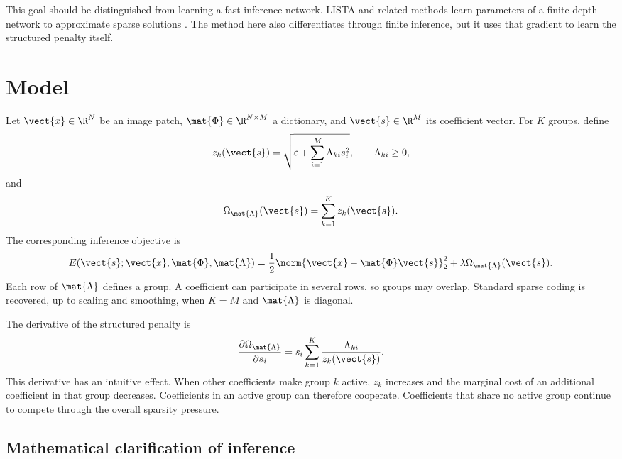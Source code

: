 This goal should be distinguished from learning a fast inference network. LISTA and related methods learn parameters of a finite-depth network to approximate sparse solutions \citep{gregor10}. The method here also differentiates through finite inference, but it uses that gradient to learn the structured penalty itself.

\section{Model}
\label{sec:group-model}

Let $\vect{x}\in\R^N$ be an image patch, $\mat{\Phi}\in\R^{N\times M}$ a dictionary, and $\vect{s}\in\R^M$ its coefficient vector. For $K$ groups, define
\begin{equation}
\label{eq:group-activity}
z_k(\vect{s})=
\sqrt{\varepsilon+\sum_{i=1}^{M}\Lambda_{ki}s_i^2},
\qquad \Lambda_{ki}\geq 0,
\end{equation}
and
\begin{equation}
\label{eq:group-penalty}
\Omega_{\mat{\Lambda}}(\vect{s})
=\sum_{k=1}^{K}z_k(\vect{s}).
\end{equation}
The corresponding inference objective is
\begin{equation}
\label{eq:group-objective}
E(\vect{s};\vect{x},\mat{\Phi},\mat{\Lambda})
=\frac{1}{2}\norm{\vect{x}-\mat{\Phi}\vect{s}}_2^2
+\lambda\Omega_{\mat{\Lambda}}(\vect{s}).
\end{equation}
Each row of $\mat{\Lambda}$ defines a group. A coefficient can participate in several rows, so groups may overlap. Standard sparse coding is recovered, up to scaling and smoothing, when $K=M$ and $\mat{\Lambda}$ is diagonal.

The derivative of the structured penalty is
\begin{equation}
\label{eq:group-coefficient-gradient}
\frac{\partial\Omega_{\mat{\Lambda}}}{\partial s_i}
=s_i\sum_{k=1}^{K}\frac{\Lambda_{ki}}{z_k(\vect{s})}.
\end{equation}
This derivative has an intuitive effect. When other coefficients make group $k$ active, $z_k$ increases and the marginal cost of an additional coefficient in that group decreases. Coefficients in an active group can therefore cooperate. Coefficients that share no active group continue to compete through the overall sparsity pressure.

\subsection{Mathematical clarification of inference}
\label{sec:group-inference-clarification}


